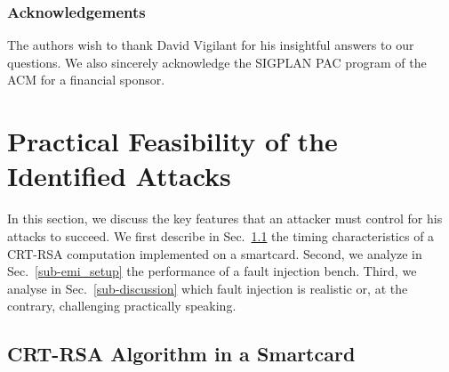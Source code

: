 \documentclass[10pt]{article}
\theoremstyle{definition}
\theoremstyle{theorem}
\begin{document}
\subsubsection*{Acknowledgements}

The authors wish to thank David Vigilant for his insightful answers to our questions.
We also sincerely acknowledge the SIGPLAN PAC program of the ACM for a financial sponsor.




\appendix
\section{Practical Feasibility of the Identified Attacks}
\label{app-practice}

In this section, we discuss the key features that an attacker must control for his attacks to succeed.
We first describe in Sec.~\ref{sub-crt-rsa-implem} the timing characteristics of a CRT-RSA computation implemented on a smartcard.
Second, we analyze in Sec.~\ref{sub-emi_setup} the performance of a fault injection bench.
Third, we analyse in Sec.~\ref{sub-discussion} which fault injection is realistic or, at the contrary, challenging practically speaking.

\subsection{CRT-RSA Algorithm in a Smartcard}
\label{sub-crt-rsa-implem}
\end{document}
